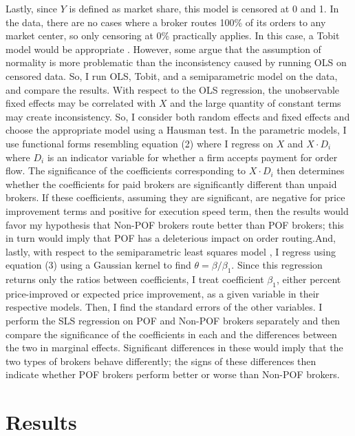 \documentclass[12pt,a4paper]{extarticle}
\begin{document}
	Lastly, since $Y$ is defined as market share, this model is censored at 0 and 1. In the data, there are no cases where a broker routes 100\% of its orders to any market center, so only censoring at 0\% practically applies. In this case, a Tobit model would be appropriate \citep{Tobin}. However, some argue that the assumption of normality is more problematic than the inconsistency caused by running OLS on censored data. So, I run OLS, Tobit, and a semiparametric model on the data, and compare the results. With respect to the OLS regression, the unobservable fixed effects may be correlated with $X$ and the large quantity of constant terms may create inconsistency. So, I consider both random effects and fixed effects and choose the appropriate model using a Hausman test. In the parametric models, I use functional forms resembling equation (2) where I regress on $X$ and $X \cdot D_i$ where $D_i$ is an indicator variable for whether a firm accepts payment for order flow. The significance of the coefficients corresponding to $X \cdot D_i$ then determines whether the coefficients for paid brokers are significantly different than unpaid brokers. If these coefficients, assuming they are significant, are negative for price improvement terms and positive for execution speed term, then the results would favor my hypothesis that Non-POF brokers route better than POF brokers; this in turn would imply that POF has a deleterious impact on order routing.And, lastly, with respect to the semiparametric least squares model \citep{Hardle}, I regress using equation (3) using a Gaussian kernel to find $\theta = \beta / \beta_1$. Since this regression returns only the ratios between coefficients, I treat coefficient $\beta_1$, either percent price-improved or expected price improvement, as a given variable in their respective models. Then, I find the standard errors of the other variables. I perform the SLS regression on POF and Non-POF brokers separately and then compare the significance of the coefficients in each and the differences between the two in marginal effects. Significant differences in these would imply that the two types of brokers behave differently; the signs of these differences then indicate whether POF brokers perform better or worse than Non-POF brokers. 
	
	


	
\section{Results}
\end{document}
